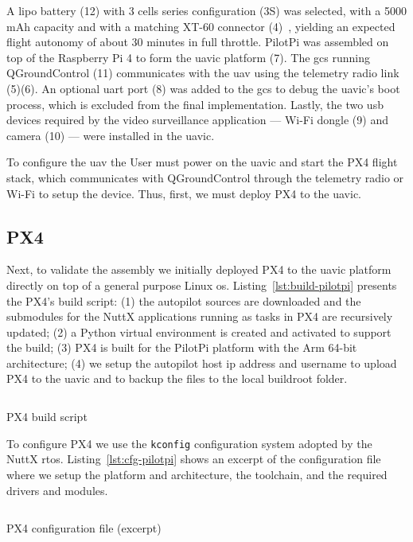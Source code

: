 A \gls{lipo} battery (12) with 3 cells series configuration (3S) was selected,
with a 5000 mAh capacity and with a matching XT-60 connector
(4)~\cite{lipo-3s-uav}, yielding an expected flight autonomy of about 30 minutes in full throttle. PilotPi was assembled on top of the Raspberry Pi 4
to form the \gls{uavic} platform (7). The \gls{gcs} running QGroundControl (11)
communicates with the \gls{uav} using the telemetry radio link (5)(6). An
optional \gls{uart} port (8) was added to the \gls{gcs} to debug the
\gls{uavic}'s boot process, which is excluded from the final
implementation. Lastly, the two \gls{usb} devices required by the video
surveillance application --- Wi-Fi dongle (9) and camera (10) --- were installed
in the \gls{uavic}.

To configure the \gls{uav} the User must power on the \gls{uavic} and start the
PX4 flight stack, which communicates with QGroundControl through the telemetry
radio or Wi-Fi to setup the device. Thus, first, we must deploy PX4 to the
\gls{uavic}.

\subsection{PX4}
\label{sec:px4}
Next, to validate the assembly we initially deployed PX4 to the \gls{uavic}
platform directly on top of a general purpose Linux
\gls{os}. Listing~\ref{lst:build-pilotpi} presents the PX4's build script: (1)
the autopilot sources are downloaded and the submodules for the NuttX
applications running as tasks in PX4 are recursively updated; (2) a Python
virtual environment is created and activated to support the build; (3) PX4 is
built for the PilotPi platform with the Arm 64-bit architecture; (4) we setup
the autopilot host \gls{ip} address and username to upload PX4 to the
\gls{uavic} and to backup the files to the local buildroot folder.

\begin{longlisting}
\centering
\inputminted[]{bash}{./listing/buildPilotPi.sh}
\caption{PX4 build script}
\label{lst:build-pilotpi}
\end{longlisting}

To configure PX4 we use the \texttt{kconfig} configuration system adopted by the
NuttX \gls{rtos}. Listing~\ref{lst:cfg-pilotpi} shows an excerpt of the
configuration file where we setup the platform and architecture, the toolchain,
and the required drivers and modules.

\begin{longlisting}
\centering
\inputminted[]{kconfig}{./listing/px4.config}
\caption{PX4 configuration file (excerpt)}
\label{lst:cfg-pilotpi}
\end{longlisting}

